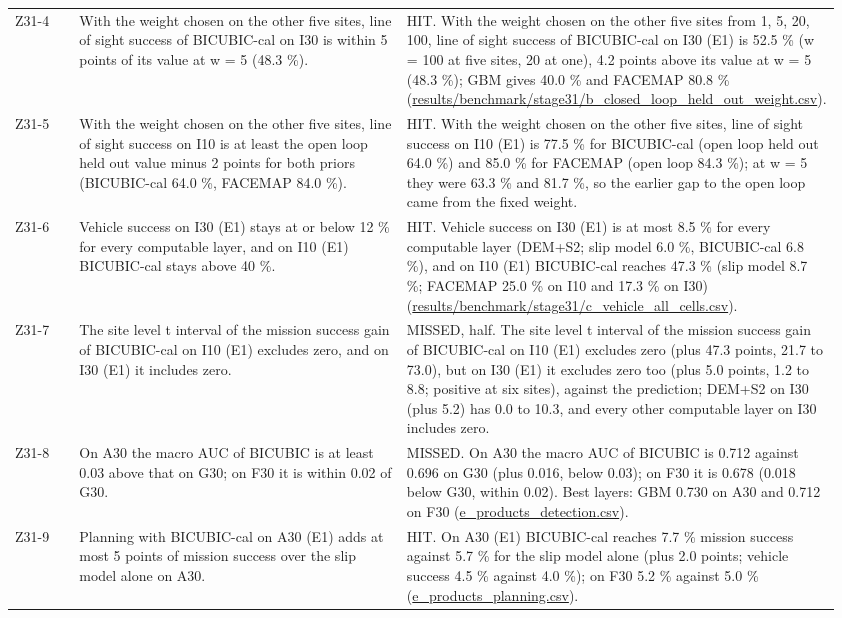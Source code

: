 \documentclass[10pt]{article}
\begin{document}
\begin{longtable}{@{}p{0.08\linewidth}p{0.42\linewidth}p{0.46\linewidth}@{}}
Z31-4 & With the weight chosen on the other five sites, line of sight success of BICUBIC-cal on I30 is within 5 points of its value at w = 5 (48.3 \%). & HIT. With the weight chosen on the other five sites from {1, 5, 20, 100}, line of sight success of BICUBIC-cal on I30 (E1) is 52.5 \% (w = 100 at five sites, 20 at one), 4.2 points above its value at w = 5 (48.3 \%); GBM gives 40.0 \% and FACEMAP 80.8 \% (\url{results/benchmark/stage31/b_closed_loop_held_out_weight.csv}). \\
Z31-5 & With the weight chosen on the other five sites, line of sight success on I10 is at least the open loop held out value minus 2 points for both priors (BICUBIC-cal 64.0 \%, FACEMAP 84.0 \%). & HIT. With the weight chosen on the other five sites, line of sight success on I10 (E1) is 77.5 \% for BICUBIC-cal (open loop held out 64.0 \%) and 85.0 \% for FACEMAP (open loop 84.3 \%); at w = 5 they were 63.3 \% and 81.7 \%, so the earlier gap to the open loop came from the fixed weight. \\
Z31-6 & Vehicle success on I30 (E1) stays at or below 12 \% for every computable layer, and on I10 (E1) BICUBIC-cal stays above 40 \%. & HIT. Vehicle success on I30 (E1) is at most 8.5 \% for every computable layer (DEM+S2; slip model 6.0 \%, BICUBIC-cal 6.8 \%), and on I10 (E1) BICUBIC-cal reaches 47.3 \% (slip model 8.7 \%; FACEMAP 25.0 \% on I10 and 17.3 \% on I30) (\url{results/benchmark/stage31/c_vehicle_all_cells.csv}). \\
Z31-7 & The site level t interval of the mission success gain of BICUBIC-cal on I10 (E1) excludes zero, and on I30 (E1) it includes zero. & MISSED, half. The site level t interval of the mission success gain of BICUBIC-cal on I10 (E1) excludes zero (plus 47.3 points, 21.7 to 73.0), but on I30 (E1) it excludes zero too (plus 5.0 points, 1.2 to 8.8; positive at six sites), against the prediction; DEM+S2 on I30 (plus 5.2) has 0.0 to 10.3, and every other computable layer on I30 includes zero. \\
Z31-8 & On A30 the macro AUC of BICUBIC is at least 0.03 above that on G30; on F30 it is within 0.02 of G30. & MISSED. On A30 the macro AUC of BICUBIC is 0.712 against 0.696 on G30 (plus 0.016, below 0.03); on F30 it is 0.678 (0.018 below G30, within 0.02). Best layers: GBM 0.730 on A30 and 0.712 on F30 (\url{e_products_detection.csv}). \\
Z31-9 & Planning with BICUBIC-cal on A30 (E1) adds at most 5 points of mission success over the slip model alone on A30. & HIT. On A30 (E1) BICUBIC-cal reaches 7.7 \% mission success against 5.7 \% for the slip model alone (plus 2.0 points; vehicle success 4.5 \% against 4.0 \%); on F30 5.2 \% against 5.0 \% (\url{e_products_planning.csv}). \\

\end{longtable}
\end{document}

